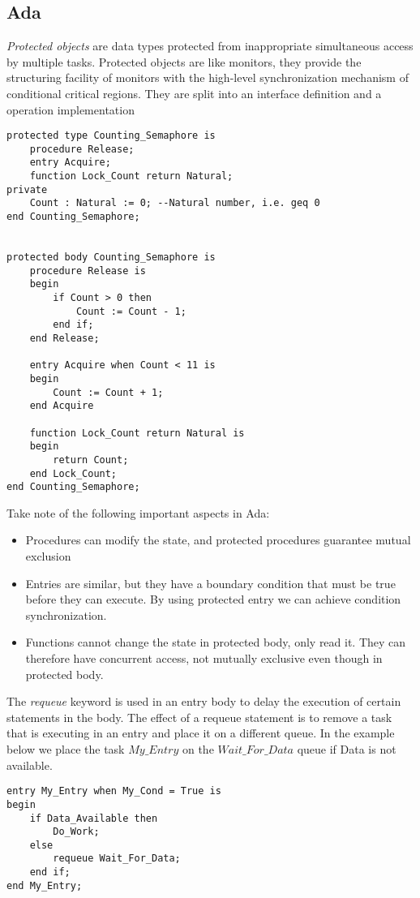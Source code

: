 \subsection{Ada}
\textit{Protected objects} are data types protected from inappropriate simultaneous access by multiple tasks. Protected objects are like monitors, they provide the structuring facility of monitors with the high-level synchronization mechanism of conditional critical regions. They are split into an interface definition and a operation implementation
\begin{verbatim}
protected type Counting_Semaphore is
    procedure Release;
    entry Acquire;
    function Lock_Count return Natural;
private
	Count : Natural := 0; --Natural number, i.e. geq 0
end Counting_Semaphore;


protected body Counting_Semaphore is
    procedure Release is
    begin
        if Count > 0 then
            Count := Count - 1;
        end if;
    end Release;
    
    entry Acquire when Count < 11 is
    begin
        Count := Count + 1;
    end Acquire
    
    function Lock_Count return Natural is
    begin
        return Count;
    end Lock_Count;
end Counting_Semaphore;
\end{verbatim}
Take note of the following important aspects in Ada:
\begin{itemize}
\item Procedures can modify the state, and protected procedures guarantee mutual exclusion
\item Entries are similar, but they have a boundary condition that must be true before they can execute. By using protected entry we can achieve condition synchronization.
\item Functions cannot change the state in protected body, only read it. They can therefore have concurrent access, not mutually exclusive even though in protected body.
\end{itemize}
The \textit{requeue} keyword is used in an entry body to delay the execution of certain statements in the body. The effect of a requeue statement is to remove a task that is executing in an entry and place it on a different queue. In the example below we place the task $My\_Entry$ on the $Wait\_For\_Data$ queue if Data is not available.

\begin{verbatim}
entry My_Entry when My_Cond = True is
begin
    if Data_Available then
        Do_Work;
    else
        requeue Wait_For_Data;
    end if;
end My_Entry;
\end{verbatim}

